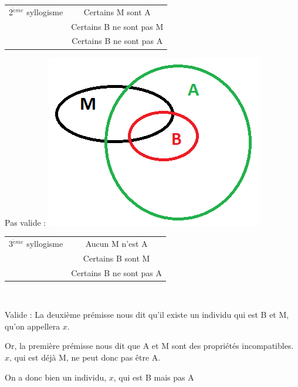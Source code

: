 \begin{frame}

\begin{tabular}{lc}
2$^{\grave{e}me}$ syllogisme & Certains M sont A \\
		& Certains B ne sont pas M \\
\cline{2-2}
		& Certains B ne sont pas A \\
\end{tabular}
\pause

Pas valide : \pause\newline
\includegraphics[scale=0.5]{S2DM3.png}

\end{frame}


\begin{frame}

\begin{tabular}{lc}
3$^{\grave{e}me}$ syllogisme & Aucun M n'est A \\
		& Certains B sont M \\
\cline{2-2}
		& Certains B ne sont pas A \\
\end{tabular}
\pause
\textcolor{white}{lol}\newline

Valide : \pause La deuxième prémisse nous dit qu'il existe un individu qui est B et M, qu'on appellera $x$. \pause\newline

Or, la première prémisse nous dit que A et M sont des propriétés incompatibles. $x$, qui est déjà M, ne peut donc pas être A.\pause\newline

On a donc bien un individu, $x$, qui est B mais pas A
\end{frame}


